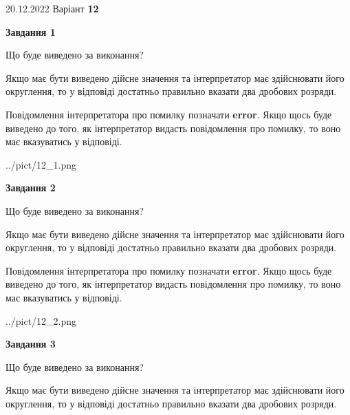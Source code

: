 \documentclass[12pt, ukrainian]{article}
\begin{document}
{20.12.2022 Варіант \No \textbf { 12 }\par}
{
\begin {Large}

{\begin {center}\textbf{Завдання 1}\end {center}}\par
Що буде виведено за виконання? \par

Якщо має бути виведено дійсне значення та інтерпретатор має здійснювати його округлення, 
то у відповіді достатньо правильно вказати два дробових розряди.

Повідомлення інтерпретатора про помилку позначати \textbf{error}.
Якщо щось буде виведено до того, як інтерпретатор видасть повідомлення про помилку, 
то воно має вказуватись у відповіді. \par

\begin{center}
	{../pict/12_1.png}
\end{center}
\newpage

{\begin {center}\textbf{Завдання 2}\end {center}}\par
Що буде виведено за виконання? \par

Якщо має бути виведено дійсне значення та інтерпретатор має здійснювати його округлення, 
то у відповіді достатньо правильно вказати два дробових розряди.

Повідомлення інтерпретатора про помилку позначати \textbf{error}.
Якщо щось буде виведено до того, як інтерпретатор видасть повідомлення про помилку, 
то воно має вказуватись у відповіді. \par

\begin{center}
	{../pict/12_2.png}
\end{center}
\newpage

{\begin {center}\textbf{Завдання 3}\end {center}}\par
Що буде виведено за виконання? \par

Якщо має бути виведено дійсне значення та інтерпретатор має здійснювати його округлення, 
то у відповіді достатньо правильно вказати два дробових розряди.


\end{Large}}
\end{document}
